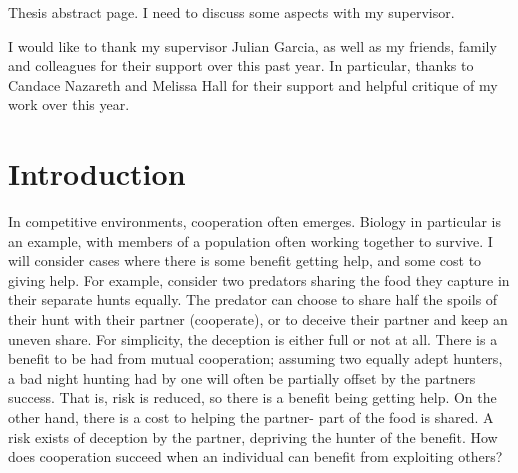 \documentclass[a4paper,11pt,bcshonoursthesis,singlespace,oneside,thesisdraft,pdflatex]{cssethesis}
\begin{document}
\frontmatter					%

\thesistitlepage				%
\thesiscopyrightpage			%
\tableofcontents				%
\listoftables					%
\listoffigures					%

\begin{thesisabstract}			%
Thesis abstract page.
I need to discuss some aspects with my supervisor.
\end{thesisabstract}                 

\thesisdeclarationpage			%

\begin{thesisacknowledgments}	%
I would like to thank my supervisor Julian Garcia, as well as my friends, family and colleagues for their support over this past year. In particular, thanks to Candace Nazareth and Melissa Hall for their support and helpful critique of my work over this year.
\end{thesisacknowledgments}   

\mainmatter						%

\chapter{Introduction}
\label{sec:intro}
In competitive environments, cooperation often emerges. 
Biology in particular is an example, with members of a population often working together to survive. 
I will consider cases where there is some benefit getting help, and some cost to giving help. 
For example, consider two predators sharing the food they capture in their separate hunts equally. 
The predator can choose to share half the spoils of their hunt with their partner (cooperate), or to deceive their partner and keep an uneven share. 
For simplicity, the deception is either full or not at all. 
There is a benefit to be had from mutual cooperation; assuming two equally adept hunters, a bad night hunting had by one will often be partially offset by the partners success. 
That is, risk is reduced, so there is a benefit being getting help. 
On the other hand, there is a cost to helping the partner- part of the food is shared. A risk exists of deception by the partner, depriving the hunter of the benefit.  
How does cooperation succeed when an individual can benefit from exploiting others? 
 
\end{document}
